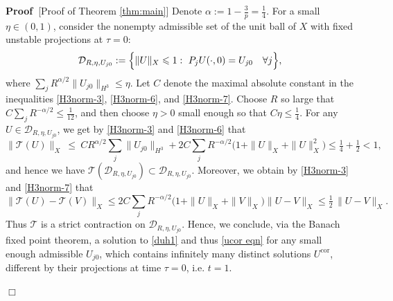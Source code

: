 \documentclass[11pt,a4paper]{article}
\numberwithin{equation}{section}
\newenvironment{proof}{\noindent\textbf{Proof\ }}{\hspace*{\fill}$\Box$\medskip}
\begin{document}
\begin{proof}[Proof of Theorem \ref{thm:main}]
Denote \(\alpha:=1-\tfrac{3}{p}=\frac14\). 
For a small $\eta\in(0,1)$, consider the nonempty admissible set of the unit ball of $X$ with fixed unstable projections at $\tau=0$:
\[
\mathcal D_{R,\eta,U_{j0}}:=\Bigl\{\|U\|_X\leqslant1: \ P_jU(\cdot,0)=U_{j0}\quad \forall j\Bigr\},
\]
where $\sum_j R^{\alpha/2}\|U_{j0}\|_{H^3}\leqslant\eta$. Let $C$ denote the maximal absolute constant in the inequalities \eqref{H3norm-3}, \eqref{H3norm-6}, and \eqref{H3norm-7}. 
Choose \(R\) so large that \(C \sum_jR^{-\alpha/2}\leqslant\frac{1}{12}\), and then choose \(\eta>0\) small enough so that
\(C\eta\leqslant\tfrac14\). For any \(U\in\mathcal D_{R,\eta,U_{j0}}\), we get by \eqref{H3norm-3} and \eqref{H3norm-6} that
\[
\|\mathcal T(U)\|_{X}\ \leqslant\ C R^{\alpha/2}\sum_j\|U_{j0}\|_{H^3} + 2 C \sum_jR^{-\alpha/2}\bigl(1+\|U\|_X+\|U\|_X^2\bigr)
 \leqslant\tfrac14 + \tfrac12 <1,
\]
and hence we have \(\mathcal T(\mathcal D_{R,\eta,U_{j0}})\subset \mathcal D_{R,\eta,U_{j0}}\).
Moreover, we obtain by \eqref{H3norm-3} and \eqref{H3norm-7} that
\[
\|\mathcal T(U)-\mathcal T(V)\|_{X}
 \leqslant2C \sum_j R^{-\alpha/2}\bigl(1+\|U\|_X+\|V\|_X\bigr)\|U-V\|_X
 \leqslant\tfrac12\,\|U-V\|_X.
\]
Thus \(\mathcal T\) is a strict contraction on \(\mathcal D_{R,\eta,U_{j0}}\).
 Hence, we conclude, via the Banach fixed point theorem,  a solution to \eqref{duh1} and thus \eqref{ucor eqn} for any small enough admissible $U_{j0}$, which contains infinitely many distinct solutions $U^{\text{cor}}$, different by their projections at time $\tau=0$, i.e. $t=1$.


\end{proof}
\end{document}

